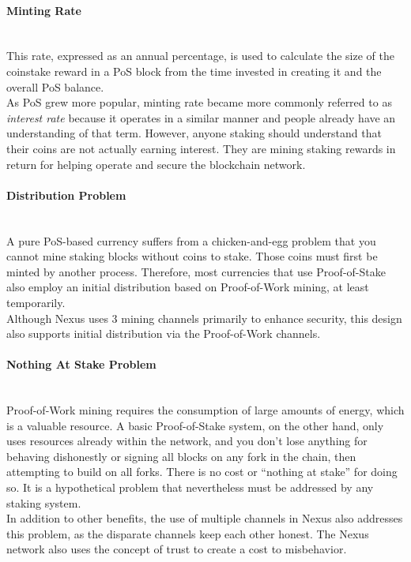 \documentclass[11pt]{article}
\begin{document}
\paragraph{Minting Rate} ~\\
This rate, expressed as an annual percentage, is used to calculate the size of the coinstake reward in a PoS block from the time invested in creating it and the overall PoS balance. \\

\noindent As PoS grew more popular, minting rate became more commonly referred to as \textit{interest rate} because it operates in a similar manner and people already have an understanding of that term. However, anyone staking should understand that their coins are not actually earning interest. They are mining staking rewards in return for helping operate and secure the blockchain network.

\paragraph{Distribution Problem} ~\\
A pure PoS-based currency suffers from a chicken-and-egg problem that you cannot mine staking blocks without coins to stake. Those coins must first be minted by another process. Therefore, most currencies that use Proof-of-Stake also employ an initial distribution based on Proof-of-Work mining, at least temporarily.\\

\noindent Although Nexus uses 3 mining channels primarily to enhance security, this design also supports initial distribution via the Proof-of-Work channels.

\paragraph{Nothing At Stake Problem} ~\\
Proof-of-Work mining requires the consumption of large amounts of energy, which is a valuable resource. A basic Proof-of-Stake system, on the other hand, only uses resources already within the network, and you don’t lose anything for behaving dishonestly or signing all blocks on any fork in the chain, then attempting to build on all forks. There is no cost or “nothing at stake” for doing so. It is a hypothetical problem that nevertheless must be addressed by any staking system.\\

\noindent In addition to other benefits, the use of multiple channels in Nexus also addresses this problem, as the disparate channels keep each other honest. The Nexus network also uses the concept of trust to create a cost to misbehavior. 
\end{document}
